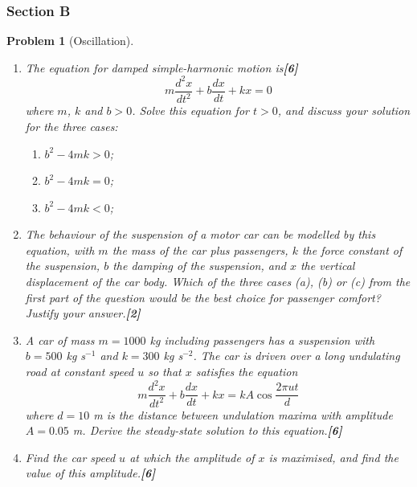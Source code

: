 \documentclass[a4paper]{article}
\theoremstyle{new}
\newtheorem{qns}{Problem}[subsection]
\begin{document}
\subsubsection{Section B}
\begin{qns}[Oscillation]\leavevmode
\begin{enumerate}[label=(\roman*)]
\item The equation for damped simple-harmonic motion is\hfill\textbf{[6]}
$$m\frac{d^2x}{dt^2}+b\frac{dx}{dt}+kx=0$$
where $m$, $k$ and $b > 0$. Solve this equation for $t > 0$, and discuss your solution for the three cases:
\begin{enumerate}[label=(\alph*)]
    \item $b^2-4mk>0$;
    \item $b^2-4mk=0$;
    \item $b^2-4mk<0$;
\end{enumerate}
\item The behaviour of the suspension of a motor car can be modelled by this equation, with $m$ the mass of the car plus passengers, $k$ the force constant of the suspension, $b$ the damping of the suspension, and $x$ the vertical displacement of the car body. Which of the three cases (a), (b) or (c) from the first part of the question would be the best choice for passenger comfort? Justify your answer.\hfill\textbf{[2]}
\item A car of mass $m = 1000$ kg including passengers has a suspension with $b = 500$ kg s$^{-1}$ and $k = 300$ kg s$^{-2}$.  The car is driven over a long undulating road at constant speed $u$ so that $x$ satisfies the equation
$$m\frac{d^2x}{dt^2}+b\frac{dx}{dt}+kx=kA\cos\frac{2\pi ut}{d}$$
where $d = 10$ m is the distance between undulation maxima with amplitude $A = 0.05$ m. Derive the steady-state solution to this equation.\hfill\textbf{[6]}
\item Find the car speed $u$ at which the amplitude of $x$ is maximised, and find the value of this amplitude.\hfill\textbf{[6]}
\end{enumerate}
\end{qns}
\newpage
\end{document}
